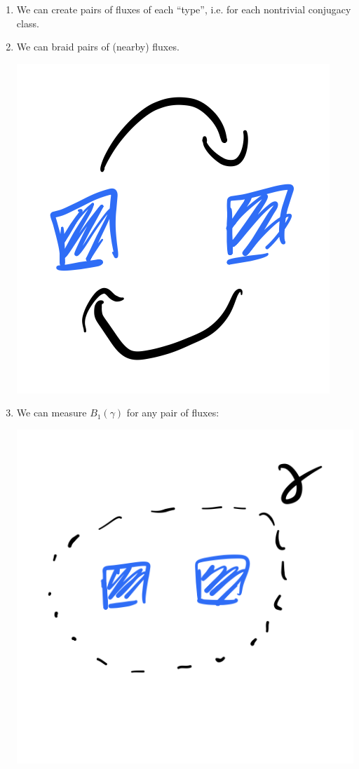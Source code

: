 \begin{enumerate}
    \item We can create pairs of fluxes of each ``type'', i.e. for each nontrivial conjugacy class.
    \item We can braid pairs of (nearby) fluxes.
    \begin{center}
        \includegraphics[scale=0.35]{Lectures/Images/lec11-swap.png}
    \end{center}
    \item We can measure $B_1(\gamma)$ for any pair of fluxes:
    \begin{center}
        \includegraphics[scale=0.35]{Lectures/Images/lec11-loop.png}

\end{center}
\end{enumerate}
